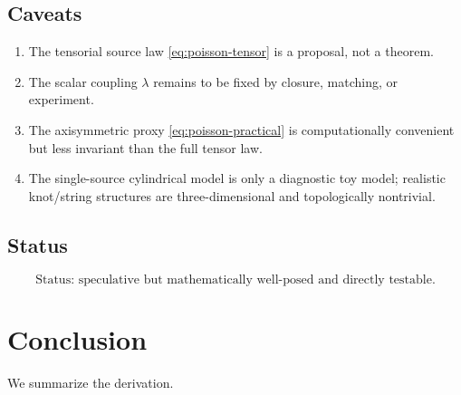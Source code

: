 \documentclass[11pt]{article}
\begin{document}
        \subsection{Caveats}
            \begin{enumerate}[label=(C\arabic*)]
\item The tensorial source law \eqref{eq:poisson-tensor} is a proposal, not a theorem.
\item The scalar coupling \(\lambda\) remains to be fixed by closure, matching, or experiment.
\item The axisymmetric proxy \eqref{eq:poisson-practical} is computationally convenient but less invariant than the full tensor law.
\item The single-source cylindrical model is only a diagnostic toy model; realistic knot/string structures are three-dimensional and topologically nontrivial.
            \end{enumerate}
        
        \subsection{Status}
            \begin{equation}
                \boxed{
                    \text{Status: speculative but mathematically well-posed and directly testable.}
                }
            \end{equation}
        
        \section{Conclusion}
        
        We summarize the derivation.
        
\end{document}
